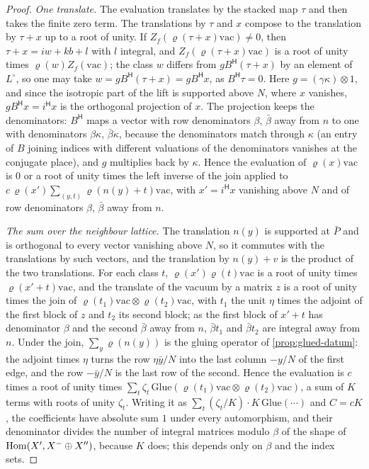 \begin{proof}
\emph{One translate.} The evaluation translates by the stacked map $\tau$ and then takes the finite zero term. The translations by $\tau$ and $x$ compose to the translation by $\tau+x$ up to a root of unity. If $Z_f(\varrho(\tau+x)\mathrm{vac})\ne0$, then $\tau+x=iw+kb+l$ with $l$ integral, and $Z_f(\varrho(\tau+x)\mathrm{vac})$ is a root of unity times
$\varrho(w)Z_f(\mathrm{vac})$; the class $w$ differs from $gB^{\mathsf H}(\tau+x)$ by an element of $L^\circ$, so one may take $w=gB^{\mathsf H}(\tau+x)=gB^{\mathsf H}x$, as $B^{\mathsf H}\tau=0$. Here $g=(\gamma\kappa)\otimes1$, and since the isotropic part of the lift is supported above $N$, where $x$ vanishes, $gB^{\mathsf H}x=i^{\mathsf H}x$
is the orthogonal projection of $x$. The projection keeps the denominators: $B^{\mathsf H}$ maps a vector with row denominators $\beta$, $\bar\beta$ away from $n$ to one with denominators $\beta\kappa$, $\bar\beta\kappa$, because the denominators match through $\kappa$ (an entry of $B$ joining indices with different valuations of the denominators
vanishes at the conjugate place), and $g$ multiplies back by $\kappa$. Hence the evaluation of $\varrho(x)\mathrm{vac}$ is $0$ or a root of unity times the left inverse of the join applied to $c\,\varrho(x')\sum_{(y,t)}\varrho(n(y)+t)\mathrm{vac}$, with $x'=i^{\mathsf H}x$ vanishing above $N$ and of row denominators $\beta$, $\bar\beta$ away
from $n$.

\emph{The sum over the neighbour lattice.} The translation $n(y)$ is supported at $\bar P$ and is orthogonal to every vector vanishing above $N$, so it commutes with the translations by such vectors, and the translation by $n(y)+v$ is the product of the two translations. For each class $t$, $\varrho(x')\varrho(t)\mathrm{vac}$ is a root of unity times
$\varrho(x'+t)\mathrm{vac}$, and the translate of the vacuum by a matrix $z$ is a root of unity times the join of $\varrho(t_1)\mathrm{vac}\otimes\varrho(t_2)\mathrm{vac}$, with $t_1$ the unit $\eta$ times the adjoint of the first block of $z$ and $t_2$ its second block; as the first block of $x'+t$ has denominator $\beta$ and the second $\bar\beta$ away
from $n$, $\bar\beta t_1$ and $\bar\beta t_2$ are integral away from $n$. Under the join, $\sum_y\varrho(n(y))$ is the gluing operator of \cref{prop:glued-datum}: the adjoint times $\eta$ turns the row $\eta\bar y/N$ into the last column $-y/N$ of the first edge, and the row $-\bar y/N$ is the last row of the second. Hence the evaluation is $c$ times a
root of unity times $\sum_t\zeta_t\,\mathrm{Glue}(\varrho(t_1)\mathrm{vac}\otimes\varrho(t_2)\mathrm{vac})$, a sum of $K$ terms with roots of unity $\zeta_t$. Writing it as $\sum_t(\zeta_t/K)\cdot K\,\mathrm{Glue}(\cdots)$ and $C=cK$, the coefficients have absolute sum $1$ under every automorphism, and their denominator divides the number of integral
matrices modulo $\beta$ of the shape of $\operatorname{Hom}(X',X^-\oplus X'')$, because $K$ does; this depends only on $\beta$ and the index sets.


\end{proof}
